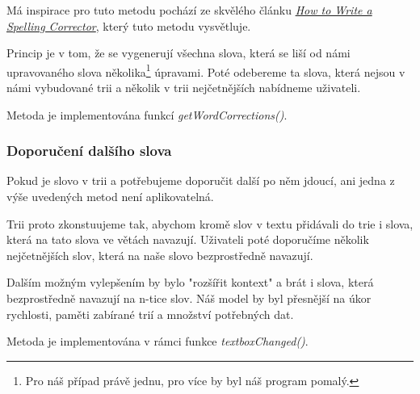 \documentclass[a4paper, 12pt]{article}
\begin{document}
  Má inspirace pro tuto metodu pochází ze skvělého článku \textit{\href{http://norvig.com/spell-correct.html}{How to Write a Spelling Corrector}}, který tuto metodu vysvětluje.

  Princip je v tom, že se vygenerují všechna slova, která se liší od námi upravovaného slova několika\footnote{Pro náš případ právě jednu, pro více by byl náš program pomalý.} úpravami. Poté odebereme ta slova, která nejsou v námi vybudované trii a několik v trii nejčetnějších nabídneme uživateli.

  Metoda je implementována funkcí \textit{getWordCorrections()}.

  \subsubsection{Doporučení dalšího slova}
  Pokud je slovo v trii a potřebujeme doporučit další po něm jdoucí, ani jedna z výše uvedených metod není aplikovatelná.

  Trii proto zkonstuujeme tak, abychom kromě slov v textu přidávali do trie i slova, která na tato slova ve větách navazují. Uživateli poté doporučíme několik nejčetnějších slov, která na naše slovo bezprostředně navazují.

  Dalším možným vylepšením by bylo "rozšířit kontext" a brát i slova, která bezprostředně navazují na n-tice slov. Náš model by byl přesnější na úkor rychlosti, paměti zabírané trií a množství potřebných dat.

  Metoda je implementována v rámci funkce \textit{textboxChanged()}.
\end{document}
